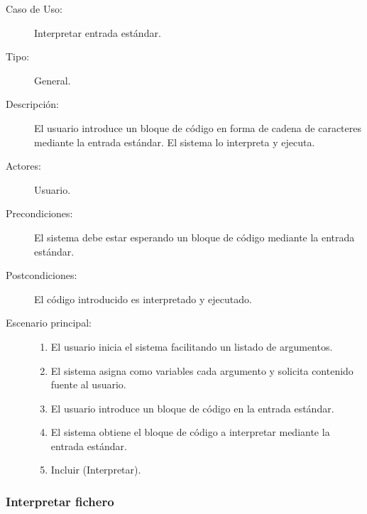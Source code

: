 \begin{description}
  \item[Caso de Uso:] 
  Interpretar entrada estándar.
  \item[Tipo:] General.
  \item[Descripción:] 
  El usuario introduce un bloque de código en forma de cadena de 
  caracteres mediante la entrada estándar. El sistema lo interpreta 
  y ejecuta.
  \item[Actores:] 
  Usuario.
  \item[Precondiciones:] 
  El sistema debe estar esperando un bloque de código mediante la entrada estándar.
  \item[Postcondiciones:] 
  El código introducido es interpretado y ejecutado.
  \item[Escenario principal:] \hfill 
  \begin{enumerate}
   \item El usuario inicia el sistema facilitando un listado de argumentos.
   \item El sistema asigna como variables cada argumento y solicita contenido fuente al usuario. 
   \item El usuario introduce un bloque de código en la entrada estándar.
   \item El sistema obtiene el bloque de código a interpretar mediante la entrada estándar.
   \item Incluir (Interpretar). 
  \end{enumerate}
\end{description}
\subsubsection{Interpretar fichero}

